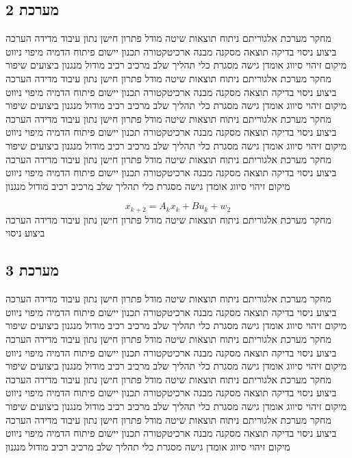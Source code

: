 \subsection{מערכת 2}
\label{sub:ch07_2}
מחקר מערכת אלגוריתם ניתוח תוצאות שיטה מודל פתרון חישן נתון עיבוד מדידה הערכה ביצוע ניסוי בדיקה תוצאה מסקנה מבנה ארכיטקטורה תכנון יישום פיתוח הדמיה מיפוי ניווט מיקום זיהוי סיווג אומדן גישה מסגרת כלי תהליך שלב מרכיב רכיב מודול מנגנון ביצועים שיפור מחקר מערכת אלגוריתם ניתוח תוצאות שיטה מודל פתרון חישן נתון עיבוד מדידה הערכה ביצוע ניסוי בדיקה תוצאה מסקנה מבנה ארכיטקטורה תכנון יישום פיתוח הדמיה מיפוי ניווט מיקום זיהוי סיווג אומדן גישה מסגרת כלי תהליך שלב מרכיב רכיב מודול מנגנון ביצועים שיפור מחקר מערכת אלגוריתם ניתוח תוצאות שיטה מודל פתרון חישן נתון עיבוד מדידה הערכה ביצוע ניסוי בדיקה תוצאה מסקנה מבנה ארכיטקטורה תכנון יישום פיתוח הדמיה מיפוי ניווט מיקום זיהוי סיווג אומדן גישה מסגרת כלי תהליך שלב מרכיב רכיב מודול מנגנון ביצועים שיפור מחקר מערכת אלגוריתם ניתוח תוצאות שיטה מודל פתרון חישן נתון עיבוד מדידה הערכה ביצוע ניסוי בדיקה תוצאה מסקנה מבנה ארכיטקטורה תכנון יישום פיתוח הדמיה מיפוי ניווט מיקום זיהוי סיווג אומדן גישה מסגרת כלי תהליך שלב מרכיב רכיב מודול מנגנון

\begin{equation}
    x_{k+2} = A_{k} x_k + B u_{k} + w_{2}
    \label{eq:ch07_2}
\end{equation}
מחקר מערכת אלגוריתם ניתוח תוצאות שיטה מודל פתרון חישן נתון עיבוד מדידה הערכה ביצוע ניסוי

\subsection{מערכת 3}
\label{sub:ch07_3}
מחקר מערכת אלגוריתם ניתוח תוצאות שיטה מודל פתרון חישן נתון עיבוד מדידה הערכה ביצוע ניסוי בדיקה תוצאה מסקנה מבנה ארכיטקטורה תכנון יישום פיתוח הדמיה מיפוי ניווט מיקום זיהוי סיווג אומדן גישה מסגרת כלי תהליך שלב מרכיב רכיב מודול מנגנון ביצועים שיפור מחקר מערכת אלגוריתם ניתוח תוצאות שיטה מודל פתרון חישן נתון עיבוד מדידה הערכה ביצוע ניסוי בדיקה תוצאה מסקנה מבנה ארכיטקטורה תכנון יישום פיתוח הדמיה מיפוי ניווט מיקום זיהוי סיווג אומדן גישה מסגרת כלי תהליך שלב מרכיב רכיב מודול מנגנון ביצועים שיפור מחקר מערכת אלגוריתם ניתוח תוצאות שיטה מודל פתרון חישן נתון עיבוד מדידה הערכה ביצוע ניסוי בדיקה תוצאה מסקנה מבנה ארכיטקטורה תכנון יישום פיתוח הדמיה מיפוי ניווט מיקום זיהוי סיווג אומדן גישה מסגרת כלי תהליך שלב מרכיב רכיב מודול מנגנון ביצועים שיפור מחקר מערכת אלגוריתם ניתוח תוצאות שיטה מודל פתרון חישן נתון עיבוד מדידה הערכה ביצוע ניסוי בדיקה תוצאה מסקנה מבנה ארכיטקטורה תכנון יישום פיתוח הדמיה מיפוי ניווט מיקום זיהוי סיווג אומדן גישה מסגרת כלי תהליך שלב מרכיב רכיב מודול מנגנון

